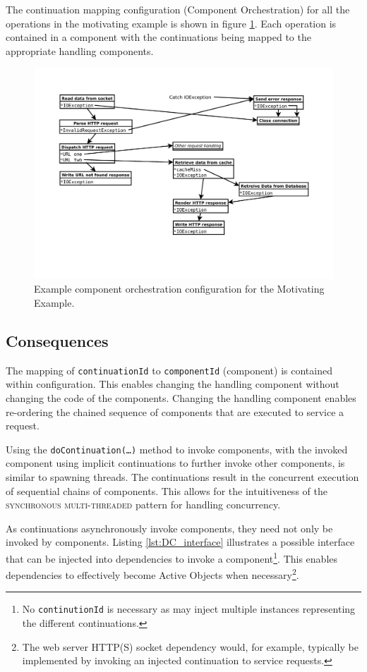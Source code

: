 \documentclass[prodmode]{style/acmlarge}
\begin{document}
The continuation mapping configuration (Component Orchestration) for all the
operations in the motivating example is shown in figure
\ref{fig:ExampleComponentOrchestration}.  Each operation is contained in a
component with the continuations being mapped to the appropriate handling
components.
 
\begin{figure}[!t]
\centering
\includegraphics[width=4.5in]{ContinuationInjectionComponentOrchestration}
\caption{Example component orchestration configuration for the Motivating Example.}
\label{fig:ExampleComponentOrchestration}
\end{figure}


\subsection{Consequences}

The mapping of \texttt{continuationId} to \texttt{componentId} (component) is
contained within configuration.  This enables changing the handling component
without changing the code of the components.  Changing the handling component
enables re-ordering the chained sequence of components that are executed to
service a request.

Using the \texttt{doContinuation(\ldots)} method to invoke components, with the
invoked component using implicit continuations to further invoke other
components, is similar to spawning threads.  The continuations result in the
concurrent execution of sequential chains of components.  This allows for the
intuitiveness of the \textsc{synchronous multi-threaded} pattern \cite{proactor}
for handling concurrency.

As continuations asynchronously invoke components, they need not only be invoked
by components. Listing \ref{lst:DC_interface} illustrates a possible interface
that can be injected into dependencies to invoke a component\footnote{No
\texttt{continutionId} is necessary as may inject multiple instances
representing the different continuations.}.  This enables dependencies to
effectively become Active Objects \cite{active-object} when
necessary\footnote{The web server HTTP(S) socket dependency would, for example,
typically be implemented by invoking an injected continuation to service
requests.}.
\end{document}
